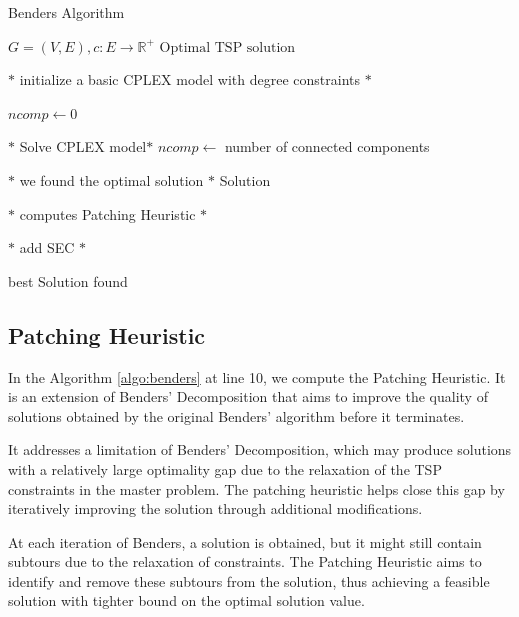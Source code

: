 \begin{algorithm}
    \caption{Benders Algorithm}\label{algo:benders}
    \begin{algorithmic}[1]
    \Require $G = (V,E), c:E \to \mathbb{R}^+$
    \Ensure $\text{Optimal TSP solution}$
    
    \State $*$ initialize a basic CPLEX model with degree constraints $*$

    \State $ ncomp \gets 0$


        \State $*$ Solve CPLEX model$*$
        \State $ncomp \gets $ number of connected components

            \State $*$ we found the optimal solution $*$
            \State \Return Solution
        \EndIf

        \State $*$ computes Patching Heuristic $*$


        \State $*$ add SEC $*$

        \EndFor

       

    \EndWhile

    \State \Return best Solution found


    \end{algorithmic}
\end{algorithm}

\subsection{Patching Heuristic}
In the Algorithm \ref{algo:benders} at line 10, we compute the Patching Heuristic.
It is an extension of Benders' Decomposition that aims to improve the quality of solutions obtained by the original Benders' algorithm before it terminates. 

It addresses a limitation of Benders' Decomposition, which may produce solutions with a relatively large optimality gap due to the relaxation of the TSP constraints in the master problem. The patching heuristic helps close this gap by iteratively improving the solution through additional modifications.

At each iteration of Benders, a solution is obtained, but it might still contain subtours due to the relaxation of constraints. The Patching Heuristic aims to identify and remove these subtours from the solution, thus achieving a feasible solution with tighter bound on the optimal solution value.

